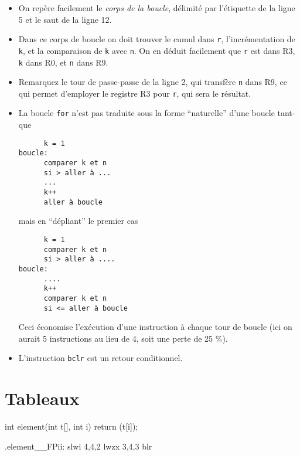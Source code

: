 \documentclass[10pt,twoside,a4paper]{article}
\begin{document}
\begin{multicols}{2}
\begin{itemize} 
\item On repère facilement le \emph{corps de la boucle}, délimité par l'étiquette
de la ligne 5 et le saut de la ligne 12.
\item Dans ce corps de boucle on doit trouver le cumul dans \texttt{r},
l'incrémentation de \texttt{k}, et la comparaison de \texttt{k} avec \texttt{n}.
On en déduit facilement que \texttt{r} est dans R3, \texttt{k} dans R0, et 
\texttt{n} dans R9.
\item Remarquez le tour de passe-passe de la ligne 2, qui transfère
\texttt{n} dans R9, ce qui permet d'employer le registre R3 pour \texttt{r}, qui sera le résultat.
\item La boucle \texttt{for} n'est pas traduite sous la forme ``naturelle''
d'une boucle tant-que
\begin{verbatim}
      k = 1
boucle:
      comparer k et n 
      si > aller à ...
      ...
      k++
      aller à boucle

\end{verbatim}
mais en ``dépliant'' le premier cas
\begin{verbatim}
      k = 1
      comparer k et n
      si > aller à ....
boucle:
      ....
      k++
      comparer k et n
      si <= aller à boucle
\end{verbatim}
Ceci économise l'exécution d'une instruction à chaque tour de boucle
(ici on aurait 5 instructions au lieu de 4, soit une perte de 25 \%).

\item L'instruction \texttt{bclr} est un retour conditionnel.

\end{itemize}

\section{Tableaux}

\begin{center}
\begin{boxedverbatim}
int element(int t[], int i)
{
  return (t[i]);
}
\end{boxedverbatim}
\end{center}

\begin{center}
\begin{boxedverbatim}
.element__FPii:
        slwi 4,4,2
        lwzx 3,4,3
        blr
\end{boxedverbatim}
\end{center}


\end{multicols}
\end{document}
